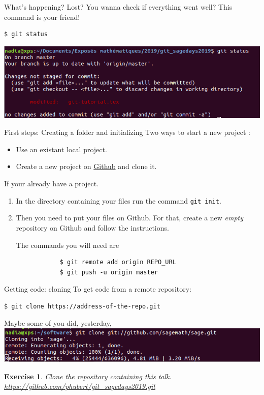 \documentclass{beamer}
\newtheorem{exo}{Exercise}
\begin{document}
	\begin{frame}[fragile]{What's happening?}
		Lost? You wanna check if everything went well? This command is your friend!
		\begin{verbatim}
$ git status
		\end{verbatim}
		\begin{center}
			\includegraphics[width=\linewidth]{status}
		\end{center}
	\end{frame}

	\begin{frame}[fragile]{First steps: Creating a folder and initializing}
		Two ways to start a new project : 
		\begin{itemize}
			\item Use an existant local project. 
			\item Create a new project on \href{https://github.com/}{Github} and clone it. \newline
		\end{itemize}
	
		If your already have a project.
		\begin{enumerate}
		\item  In the directory containing your files run the command 
		\texttt{git init}.
		
		\item  Then you need to put your files on Github. For that, create a new \emph{empty} repository on Github and follow the instructions.
		
		The commands you will need are 
		\begin{verbatim}
			$ git remote add origin REPO_URL
			$ git push -u origin master
		\end{verbatim}
		
		\end{enumerate}   
	\end{frame}

	\begin{frame}[fragile]{Getting code: cloning}
	To get code from a remote repository:
	\begin{verbatim}
$ git clone https://address-of-the-repo.git
	\end{verbatim}
	Maybe some of you did, yesterday,
	\includegraphics[width=\linewidth]{clone}
	\pause
	\begin{exo}
		Clone the repository containing this talk.
		\url{https://github.com/phubert/git_sagedays2019.git}
	\end{exo}
	\end{frame}
\end{document}
